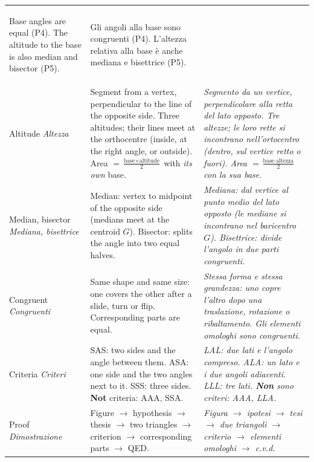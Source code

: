 \documentclass[10pt,a4paper,oneside]{book}
\begin{document}
{\begin{tabularx}{\textwidth}{@{}>{\bfseries\color{navy}\raggedright\arraybackslash}p{2.1cm} >{\raggedright\arraybackslash}X >{\raggedright\arraybackslash\itshape\leavevmode\color{itgreen}}X@{}}
Base angles are equal (P4). The altitude to the base is also median and bisector (P5). &
Gli angoli alla base sono congruenti (P4). L'altezza relativa alla base è anche mediana e bisettrice (P5).\\
Altitude \newline \textit{Altezza} &
Segment from a vertex, perpendicular to the line of the opposite side. Three altitudes; their lines meet at the orthocentre (inside, at the right angle, or outside). Area $= \frac{\text{base} \times \text{altitude}}{2}$ with \emph{its own} base. &
Segmento da un vertice, perpendicolare alla retta del lato opposto. Tre altezze; le loro rette si incontrano nell'ortocentro (dentro, sul vertice retto o fuori). Area $= \frac{\text{base} \cdot \text{altezza}}{2}$ con la \emph{sua} base.\\
Median, bisector \newline \textit{Mediana, bisettrice} &
Median: vertex to midpoint of the opposite side (medians meet at the centroid $G$). Bisector: splits the angle into two equal halves. &
Mediana: dal vertice al punto medio del lato opposto (le mediane si incontrano nel baricentro $G$). Bisettrice: divide l'angolo in due parti congruenti.\\
Congruent \newline \textit{Congruenti} &
Same shape and same size: one covers the other after a slide, turn or flip. Corresponding parts are equal. &
Stessa forma e stessa grandezza: uno copre l'altro dopo una traslazione, rotazione o ribaltamento. Gli elementi omologhi sono congruenti.\\
Criteria \newline \textit{Criteri} &
SAS: two sides and the angle between them. ASA: one side and the two angles next to it. SSS: three sides. \textbf{Not} criteria: AAA, SSA. &
LAL: due lati e l'angolo compreso. ALA: un lato e i due angoli adiacenti. LLL: tre lati. \textbf{\upshape Non} sono criteri: AAA, LLA.\\
Proof \newline \textit{Dimostrazione} &
Figure $\to$ hypothesis $\to$ thesis $\to$ two triangles $\to$ criterion $\to$ corresponding parts $\to$ QED. &
Figura $\to$ ipotesi $\to$ tesi $\to$ due triangoli $\to$ criterio $\to$ elementi omologhi $\to$ c.v.d.\\
\bottomrule
\end{tabularx}
}
\end{document}
